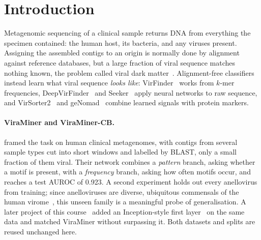\documentclass[10pt,twocolumn,a4paper]{article}
\begin{document}

\section{Introduction}

Metagenomic sequencing of a clinical sample returns DNA from everything the
specimen contained: the human host, its bacteria, and any viruses present.
Assigning the assembled contigs to an origin is normally done by alignment
against reference databases, but a large fraction of viral sequence matches
nothing known, the problem called viral dark
matter~\cite{krishnamurthy2017darkmatter}. Alignment-free classifiers instead
learn what viral sequence \emph{looks like}: VirFinder~\cite{ren2017virfinder}
works from $k$-mer frequencies, DeepVirFinder~\cite{ren2020deepvirfinder} and
Seeker~\cite{auslander2020seeker} apply neural networks to raw sequence, and
VirSorter2~\cite{guo2021virsorter2} and geNomad~\cite{camargo2024genomad}
combine learned signals with protein markers.

\paragraph{ViraMiner and ViraMiner-CB.}
\citet{tampuu2019viraminer} framed the task on human clinical metagenomes, with
contigs from several sample types cut into short windows and labelled by BLAST,
only a small fraction of them viral. Their network combines a \emph{pattern}
branch, asking whether a motif is present, with a \emph{frequency} branch,
asking how often motifs occur, and reaches a test AUROC of 0.923. A second
experiment holds out every anellovirus from training; since anelloviruses are
diverse, ubiquitous commensals of the human
virome~\cite{kaczorowska2020anello}, this unseen family is a meaningful probe of
generalisation. A later project of this course~\cite{pivotto2024viraminercb}
added an Inception-style first layer~\cite{szegedy2015inception} on the same
data and matched ViraMiner without surpassing it. Both datasets and splits are
reused unchanged here.
\end{document}
